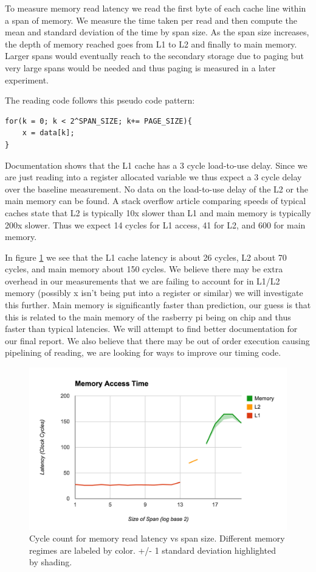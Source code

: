 To measure memory read latency we read the first byte of each cache line within a span of memory.  
We measure the time taken per read and then compute the mean and standard deviation of the time by span size.
As the span size increases, the depth of memory reached goes from L1 to L2 and finally to main memory.  
Larger spans would eventually reach to the secondary storage due to paging but very large spans would be needed and thus paging is measured in a later experiment.

The reading code follows this pseudo code pattern:
\begin{verbatim}
for(k = 0; k < 2^SPAN_SIZE; k+= PAGE_SIZE){
	x = data[k];
}
\end{verbatim}

Documentation shows that the L1 cache has a 3 cycle load-to-use delay.  Since we are just reading into a register allocated variable we thus expect a 3 cycle delay over the baseline measurement.  No data on the load-to-use delay of the L2 or the main memory can be found.  A stack overflow article comparing speeds of typical caches state that L2 is typically 10x slower than L1 and main memory is typically 200x slower.  Thus we expect 14 cycles for L1 access, 41 for L2, and 600 for main memory.

In figure \ref{fig:exp_2_1} we see that the L1 cache latency is about 26 cycles, L2 about 70 cycles, and main memory about 150 cycles.  We believe there may be extra overhead in our measurements that we are failing to account for in L1/L2 memory (possibly x isn't being put into a register or similar) we will investigate this further.  Main memory is significantly faster than prediction, our guess is that this is related to the main memory of the rasberry pi being on chip and thus faster than typical latencies. We will attempt to find better documentation for our final report.  We also believe that there may be out of order execution causing pipelining of reading,  we are looking for ways to improve our timing code.

\begin{figure}[h]
\label{fig:exp_2_1}
\centering
\includegraphics[scale=.5]{experiments/exp_2_1_fig.png}
\caption{Cycle count for memory read latency vs span size.  
Different memory regimes are labeled by color.  +/- 1 standard deviation highlighted by shading.}
\end{figure}